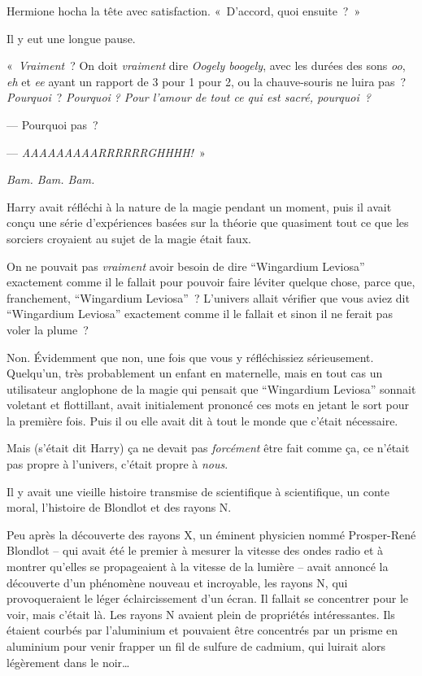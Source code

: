 Hermione hocha la tête avec satisfaction.
«~D'accord, quoi ensuite~?~»

Il y eut une longue pause.

«~\emph{Vraiment}~?
On doit \emph{vraiment} dire \emph{Oogely boogely}, avec les durées des sons \emph{oo}, \emph{eh} et \emph{ee} ayant un rapport de 3 pour 1 pour 2, ou la chauve-souris ne luira pas~?
\emph{Pourquoi}~?
\emph{Pourquoi} \emph{?
Pour l'amour de tout ce qui est sacré, pourquoi~?}

--- Pourquoi pas~?

--- \emph{AAAAAAAAARRRRRRGHHHH!}~»

\emph{Bam.
Bam. Bam.}

Harry avait réfléchi à la nature de la magie pendant un moment, puis il avait conçu une série d'expériences basées sur la théorie que quasiment tout ce que les sorciers croyaient au sujet de la magie était faux.

On ne pouvait pas \emph{vraiment} avoir besoin de dire “Wingardium Leviosa” exactement comme il le fallait pour pouvoir faire léviter quelque chose, parce que, franchement, “Wingardium Leviosa”~?
L'univers allait vérifier que vous aviez dit “Wingardium Leviosa” exactement comme il le fallait et sinon il ne ferait pas voler la plume~?

Non. Évidemment que non, une fois que vous y réfléchissiez sérieusement.
Quelqu'un, très probablement un enfant en maternelle, mais en tout cas un utilisateur anglophone de la magie qui pensait que “Wingardium Leviosa” sonnait voletant et flottillant, avait initialement prononcé ces mots en jetant le sort pour la première fois.
Puis il ou elle avait dit à tout le monde que c'était nécessaire.

Mais (s'était dit Harry) ça ne devait pas \emph{forcément} être fait comme ça, ce n'était pas propre à l'univers, c'était propre à \emph{nous}.

Il y avait une vieille histoire transmise de scientifique à scientifique, un conte moral, l'histoire de Blondlot et des rayons N.

Peu après la découverte des rayons X, un éminent physicien nommé Prosper-René Blondlot -- qui avait été le premier à mesurer la vitesse des ondes radio et à montrer qu'elles se propageaient à la vitesse de la lumière -- avait annoncé la découverte d'un phénomène nouveau et incroyable, les rayons N, qui provoqueraient le léger éclaircissement d'un écran.
Il fallait se concentrer pour le voir, mais c'était là.
Les rayons N avaient plein de propriétés intéressantes.
Ils étaient courbés par l'aluminium et pouvaient être concentrés par un prisme en aluminium pour venir frapper un fil de sulfure de cadmium, qui luirait alors légèrement dans le noir…


